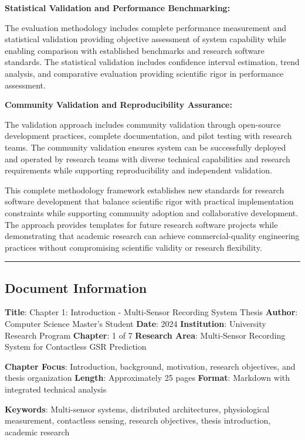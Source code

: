 \documentclass[11pt,a4paper]{article}
\begin{document}
\textbf{Statistical Validation and Performance Benchmarking:}

The evaluation methodology includes complete performance measurement and
statistical validation providing objective
assessment of system capability while enabling comparison with established
benchmarks and research software standards.
The statistical validation includes confidence interval estimation, trend
analysis, and comparative evaluation providing
scientific rigor in performance assessment.

\textbf{Community Validation and Reproducibility Assurance:}

The validation approach includes community validation through open-source
development practices, complete
documentation, and pilot testing with research teams. The community validation
ensures system can be successfully
deployed and operated by research teams with diverse technical capabilities and
research requirements while supporting
reproducibility and independent validation.

This complete methodology framework establishes new standards for research
software development that balance
scientific rigor with practical implementation constraints while supporting
community adoption and collaborative
development. The approach provides templates for future research software
projects while demonstrating that academic
research can achieve commercial-quality engineering practices without
compromising scientific validity or research
flexibility.

\hrule

\subsection{Document Information}

\textbf{Title}: Chapter 1: Introduction - Multi-Sensor Recording System Thesis
\textbf{Author}: Computer Science Master's Student
\textbf{Date}: 2024
\textbf{Institution}: University Research Program
\textbf{Chapter}: 1 of 7
\textbf{Research Area}: Multi-Sensor Recording System for Contactless GSR Prediction

\textbf{Chapter Focus}: Introduction, background, motivation, research objectives, and thesis organization
\textbf{Length}: Approximately 25 pages
\textbf{Format}: Markdown with integrated technical analysis

\textbf{Keywords}: Multi-sensor systems, distributed architectures, physiological measurement, contactless sensing, research
objectives, thesis introduction, academic research
\end{document}
